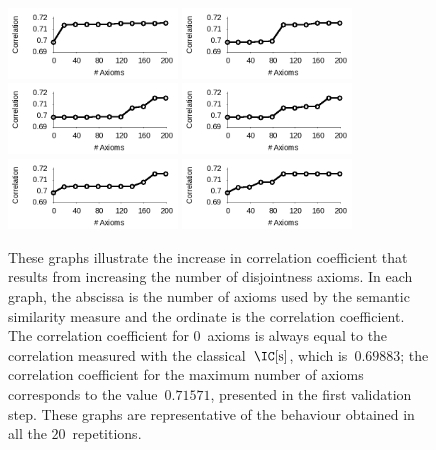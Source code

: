 \begin{figure}
    \centering
    \includegraphics[width=0.4\textwidth]{images/plot18.png}
    \includegraphics[width=0.4\textwidth]{images/plot17.png}
    \includegraphics[width=0.4\textwidth]{images/plot3.png}
    \includegraphics[width=0.4\textwidth]{images/plot1.png}
    \includegraphics[width=0.4\textwidth]{images/plot10.png}
    \includegraphics[width=0.4\textwidth]{images/plot8.png}
    \caption[The effect of increasing number of disjointness axioms]{These graphs illustrate the increase in correlation coefficient that results from increasing the number of disjointness axioms. In each graph, the abscissa is the number of axioms used by the semantic similarity measure and the ordinate is the correlation coefficient. The correlation coefficient for $0$~axioms is always equal to the correlation measured with the classical~$\ICs$, which is~$0.69883$; the correlation coefficient for the maximum number of axioms corresponds to the value~$0.71571$, presented in the first validation step. These graphs are representative of the behaviour obtained in all the $20$~repetitions.}
    \label{fig:evolution}
\end{figure}

